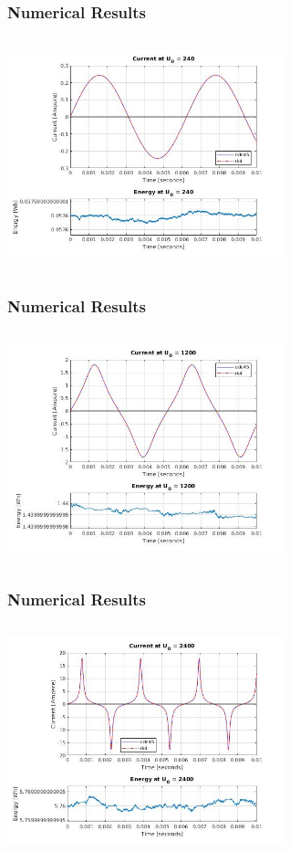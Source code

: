 \documentclass[aspectratio=1610]{beamer}
\begin{document}
\begin{frame}
\frametitle{Numerical Results}
\begin{columns}
\column{37em}
\centerline{\vspace*{2cm}\includegraphics[width=8cm]{figs/240V + E.jpg}}
\end{columns}
\end{frame}
\begin{frame}
\frametitle{Numerical Results}
\begin{columns}
\column{37em}
\centerline{\vspace*{2cm}\includegraphics[width=8cm]{figs/1200V + E.jpg}}
\end{columns}
\end{frame}
\begin{frame}
\frametitle{Numerical Results}
\begin{columns}
\column{37em}
\centerline{\vspace*{2cm}\includegraphics[width=8cm]{figs/2400V + E.jpg}}
\end{columns}
\end{frame}
\end{document}
